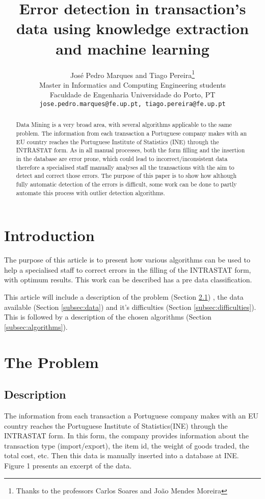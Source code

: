 \documentclass[12pt]{article}
\title{Error detection in transaction's data using knowledge extraction and machine learning}
\author{
	José Pedro Marques and Tiago Pereira\thanks{Thanks to the professors Carlos Soares and João Mendes Moreira}\\
	\small Master in Informatics and Computing Engineering students\\[-0.8ex]
	\small Faculdade de Engenharia Universidade do Porto, PT\\
	\small \texttt{jose.pedro.marques@fe.up.pt, tiago.pereira@fe.up.pt}\\
}
\begin{document}
\maketitle

\begin{abstract}
Data Mining is a very broad area, with several algorithms applicable to the same problem.
The information from each transaction a Portuguese company makes with an EU country reaches the Portuguese Institute of Statistics (INE) through the INTRASTAT form. As in all manual processes, both the form filling and the insertion in the database are error prone, which could lead to incorrect/inconsistent data therefore a specialised staff manually analyses all the transactions with the aim to detect and correct those errors.
The purpose of this paper is to show how although fully automatic detection of the errors is difficult, some work can be done to partly automate this process with outlier detection algorithms.
\end{abstract}

\section{Introduction}

The purpose of this article is to present how various algorithms can be used to help a specialised staff to correct errors in the filling of the INTRASTAT form, with optimum results.
This work can be described has a pre data classification.

This article will include a description of the problem (Section \ref{subsec:description}) , the data available (Section \ref{subsec:data}) and it's difficulties (Section \ref{subsec:difficulties}). This is followed by a description of the chosen algorithms (Section \ref{subsec:algorithms}).

\section{The Problem}
\subsection{Description}
\label{subsec:description}
The information from each transaction a Portuguese company makes with an EU country reaches the Portuguese Institute of Statistics(INE) through the INTRASTAT form. In this form, the company provides information  about the transaction type (import/export), the item id, the weight of goods traded, the total cost, etc. Then this data is manually inserted into a database at INE. Figure 1 presents an excerpt of the data.
\end{document}
